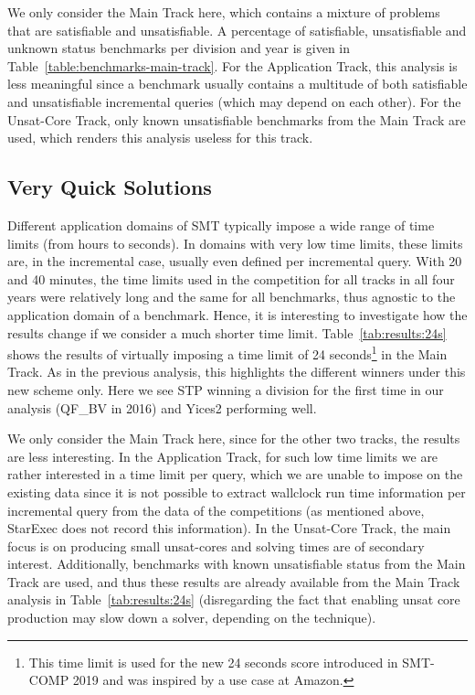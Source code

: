 \documentclass[dvipsnames,table,twoside,11pt]{article}
\newcommand{\maintrack}{Main Track\xspace}
\newcommand{\apptrack}{Application Track\xspace}
\newcommand{\ucoretrack}{Unsat-Core Track\xspace}
\begin{document}
We only consider the \maintrack here, which contains a mixture of problems that
are satisfiable and unsatisfiable. A percentage of satisfiable, unsatisfiable
and unknown status benchmarks per division and year is given in
Table~\ref{table:benchmarks-main-track}.  For the \apptrack, this analysis is
less meaningful since a benchmark usually contains a multitude of both
satisfiable and unsatisfiable incremental queries
(which may depend on each other).
For the \ucoretrack, only known unsatisfiable benchmarks from the \maintrack
are used, which renders this analysis useless for this track.





\subsection{Very Quick Solutions}

Different application domains of SMT typically impose a wide range of time
limits (from hours to seconds). In domains with very low time limits, these
limits are, in the incremental case, usually even defined per incremental
query.  With 20 and 40 minutes, the time limits used in the competition for all
tracks in all four years were relatively long and the same for all benchmarks,
thus agnostic to the application domain of a benchmark.  Hence, it is
interesting to investigate how the results change if we consider a much shorter
time limit.  Table~\ref{tab:results:24s} shows the results of virtually
imposing a time limit of 24 seconds\footnote{This time limit is used for the
new 24 seconds score introduced in SMT-COMP 2019 and was inspired by a use case
at Amazon.} in the \maintrack.  As in the previous analysis, this highlights the
different winners under this new scheme only. Here we see STP winning a
division for the first time in our analysis (QF\_BV in 2016) and Yices2
performing well.

We only consider the \maintrack here, since for the other two tracks, the
results are less interesting.  In the \apptrack, for such low time limits we
are rather interested in a time limit per query, which we are unable to impose
on the existing data since it is not possible to extract wallclock run time
information per incremental query from the data of the competitions (as
mentioned above, StarExec does not record this information).  In the
\ucoretrack, the main focus is on producing small unsat-cores and solving times
are of secondary interest.  Additionally, benchmarks with known unsatisfiable
status from the \maintrack are used, and thus these results are already
available from the \maintrack analysis in Table~\ref{tab:results:24s}
(disregarding the fact that enabling unsat core production may slow down a
solver, depending on the technique).
\end{document}
